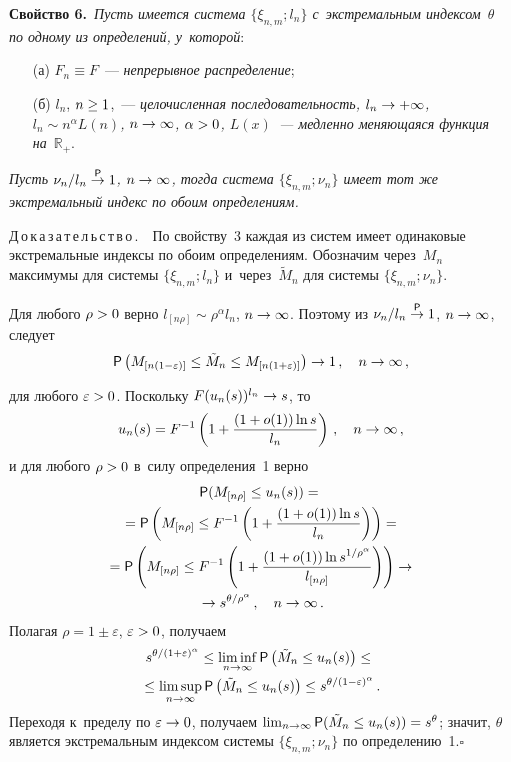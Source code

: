 \begin{multicols}{2}
\smallskip

\noindent
\textbf{Свойство 6.}\ \textit{Пусть имеется система $\{\xi_{n,m}; l_n\}$
с~экстремальным индексом~$\theta$ по одному
из определений, у~которой}:
\begin{enumerate}
\item[(а)] $F_n\equiv F$~--- \textit{непрерывное распределение};
\item[(б)] $l_n$, $n\hm\ge 1$,~--- \textit{целочисленная последовательность,
$l_n\hm\to +\infty$, $l_n\sim n^{\alpha}L(n)$, $n\hm\to\infty$, $\alpha\hm>0$,
$L(x)$~--- медленно меняющаяся функция на}~${\mathbb{R}}_+$.
\end{enumerate}

\textit{Пусть $\nu_n/l_n\stackrel{{\sf P}}{\to} 1$, $n\hm\to\infty$,
тогда система $\{\xi_{n,m}; \nu_n\}$ имеет тот же экстремальный индекс
по обоим определениям.}

\smallskip


\noindent
Д\,о\,к\,а\,з\,а\,т\,е\,л\,ь\,с\,т\,в\,о\,.\ \
По свойству~3 каждая из сис\-тем имеет одинаковые экстремальные индексы по
 обоим определениям.
Обозначим через~$M_n$ максимумы для системы
$\{\xi_{n,m}; l_n\}$ и~через~${\tilde M}_n$ для
системы $\{\xi_{n,m}; \nu_n\}$.



Для любого $\rho\hm>0$ верно $l_{[n\rho]}\sim\rho^\alpha l_n$, $n\hm\to\infty$.
Поэтому из $\nu_n/l_n\stackrel{{\sf P}}{\to} 1$, $n\hm\to\infty$,
следует
$$
{\sf P}\left(M_{[n(1-\varepsilon)]}\le {\tilde M}_n\le M_{[n(1+\varepsilon)]}\right)
\to 1\,,\quad n\to\infty\,,
$$

\vspace*{-4pt}

\pagebreak



\noindent
для любого $\varepsilon\hm>0$. Поскольку $F(u_n(s))^{l_n}\hm\to s$, то
$$
u_n(s)=F^{-1}\left(1+\displaystyle\frac{\displaystyle (1+o(1))\ln s\mathstrut}{\displaystyle l_n\mathstrut}\right)\,,\quad n\to\infty\,,
$$
и для любого $\rho\hm>0$ в~силу определения~1 верно
\begin{multline*}
{\sf P}(M_{[n\rho]}\le u_n(s))={}\\
{}={\sf P}\left(M_{[n\rho]}\le F^{-1}\left(1+\displaystyle\frac{\displaystyle (1+o(1))\ln s\mathstrut}{\displaystyle l_n\mathstrut}\right)\right)={}\\
{}=
{\sf P}\left(
M_{[n\rho]}\le  F^{-1}\left(1+
\displaystyle\frac{\displaystyle (1+o(1))\ln s^{1/\rho^\alpha}\mathstrut}{\displaystyle l_{[n\rho]}\mathstrut}\right)\right)\to {}\\
{}\to
s^{\theta/\rho^\alpha}\,,\quad n\to\infty\,.
\end{multline*}
Полагая $\rho=1\pm\varepsilon$, $\varepsilon\hm>0$, получаем
\begin{multline*}
s^{\theta/(1+\varepsilon)^\alpha}\le\liminf\limits_{n\to\infty}{\sf P}
\left({\tilde M}_n\le u_n(s)\right)\le{}\\
{}\le
\limsup\limits_{n\to\infty}{\sf P}\left({\tilde M}_n\le u_n(s)\right)\le
s^{\theta/(1-\varepsilon)^\alpha}\,.
\end{multline*}
Переходя к~пределу по $\varepsilon\hm\to 0$, получаем
$\lim_{n\to\infty}{\sf P}({\tilde M}_n\le u_n(s))\hm=s^\theta$;
значит, $\theta$ является экстремальным индексом системы
$\{\xi_{n,m}; \nu_n\}$ по определению~1.\hfill$\square$


\end{multicols}
